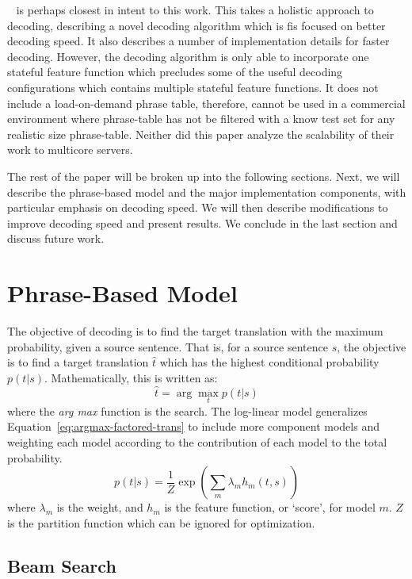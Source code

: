 \documentclass[11pt]{article}
\begin{document}
~ is perhaps closest in intent to this work. This takes a holistic approach to decoding, describing a novel decoding algorithm which is fis focused on better decoding speed. It also describes a number of implementation details for faster decoding. However, the decoding algorithm is only able to incorporate one stateful feature function which precludes some of the useful decoding configurations which contains multiple stateful feature functions. It does not include a load-on-demand phrase table, therefore, cannot be used in a commercial environment where phrase-table has not be filtered with a know test set for any realistic size phrase-table. Neither did this paper analyze the scalability of their work to multicore servers.

The rest of the paper will be broken up into the following sections. Next, we will describe the phrase-based model and the major implementation components, with particular emphasis on decoding speed. We will then describe modifications to improve decoding speed and present results. We conclude in the last section and discuss future work.

\section{Phrase-Based Model}

The objective of decoding is to find the target translation with the maximum probability, given a source sentence. That is, for a source sentence $s$, the objective is to find a target translation $\hat{t}$ which has the highest conditional probability $p(t | s)$. Mathematically, this is written as:
\begin{equation}
\hat{t} = \arg \max_t p( t | s )
\label{eq:argmax-factored-trans}
\end{equation}
where the \emph{arg max} function is the search. The log-linear model generalizes Equation~\ref{eq:argmax-factored-trans} to include more component models and weighting each model according to the contribution of each model to the total probability. 
\begin{equation}
\label{eq:Log-Linear}
p(t | s) 	=  \frac{1}{Z} \exp ( \sum_m \lambda_m h_m ( t, s)^{} )
\end{equation}
where $\lambda_m$ is the weight, and $h_m$ is the feature function, or `score', for model $m$. $Z$ is the partition function which can be ignored for optimization. 

\subsection{Beam Search}
\end{document}
